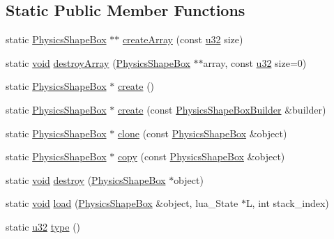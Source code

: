 \subsection*{Static Public Member Functions}
\begin{DoxyCompactItemize}
\item 
static \mbox{\hyperlink{classnjli_1_1_physics_shape_box}{Physics\+Shape\+Box}} $\ast$$\ast$ \mbox{\hyperlink{classnjli_1_1_physics_shape_box_a0b8e1c864d1fc1be5e6b4b003666498b}{create\+Array}} (const \mbox{\hyperlink{_util_8h_a10e94b422ef0c20dcdec20d31a1f5049}{u32}} size)
\item 
static \mbox{\hyperlink{_thread_8h_af1e856da2e658414cb2456cb6f7ebc66}{void}} \mbox{\hyperlink{classnjli_1_1_physics_shape_box_a6d55d7d82a7670804d59a2b8f78f649d}{destroy\+Array}} (\mbox{\hyperlink{classnjli_1_1_physics_shape_box}{Physics\+Shape\+Box}} $\ast$$\ast$array, const \mbox{\hyperlink{_util_8h_a10e94b422ef0c20dcdec20d31a1f5049}{u32}} size=0)
\item 
static \mbox{\hyperlink{classnjli_1_1_physics_shape_box}{Physics\+Shape\+Box}} $\ast$ \mbox{\hyperlink{classnjli_1_1_physics_shape_box_acc8fc5e187407dd0f03767fd19d82de2}{create}} ()
\item 
static \mbox{\hyperlink{classnjli_1_1_physics_shape_box}{Physics\+Shape\+Box}} $\ast$ \mbox{\hyperlink{classnjli_1_1_physics_shape_box_ab191df13c23f00ae7119b265444d3792}{create}} (const \mbox{\hyperlink{classnjli_1_1_physics_shape_box_builder}{Physics\+Shape\+Box\+Builder}} \&builder)
\item 
static \mbox{\hyperlink{classnjli_1_1_physics_shape_box}{Physics\+Shape\+Box}} $\ast$ \mbox{\hyperlink{classnjli_1_1_physics_shape_box_aa04d5e621853d74464758ee5a48b6f73}{clone}} (const \mbox{\hyperlink{classnjli_1_1_physics_shape_box}{Physics\+Shape\+Box}} \&object)
\item 
static \mbox{\hyperlink{classnjli_1_1_physics_shape_box}{Physics\+Shape\+Box}} $\ast$ \mbox{\hyperlink{classnjli_1_1_physics_shape_box_a53c86d86b8d75802aedcf6bc187d7775}{copy}} (const \mbox{\hyperlink{classnjli_1_1_physics_shape_box}{Physics\+Shape\+Box}} \&object)
\item 
static \mbox{\hyperlink{_thread_8h_af1e856da2e658414cb2456cb6f7ebc66}{void}} \mbox{\hyperlink{classnjli_1_1_physics_shape_box_af2cedff97d4c5d4f4c9b48b747151edc}{destroy}} (\mbox{\hyperlink{classnjli_1_1_physics_shape_box}{Physics\+Shape\+Box}} $\ast$object)
\item 
static \mbox{\hyperlink{_thread_8h_af1e856da2e658414cb2456cb6f7ebc66}{void}} \mbox{\hyperlink{classnjli_1_1_physics_shape_box_a57859a8942039904a92578f289aa9236}{load}} (\mbox{\hyperlink{classnjli_1_1_physics_shape_box}{Physics\+Shape\+Box}} \&object, lua\+\_\+\+State $\ast$L, int stack\+\_\+index)
\item 
static \mbox{\hyperlink{_util_8h_a10e94b422ef0c20dcdec20d31a1f5049}{u32}} \mbox{\hyperlink{classnjli_1_1_physics_shape_box_ae95550307295d398f96489183c27f8f1}{type}} ()
\end{DoxyCompactItemize}
